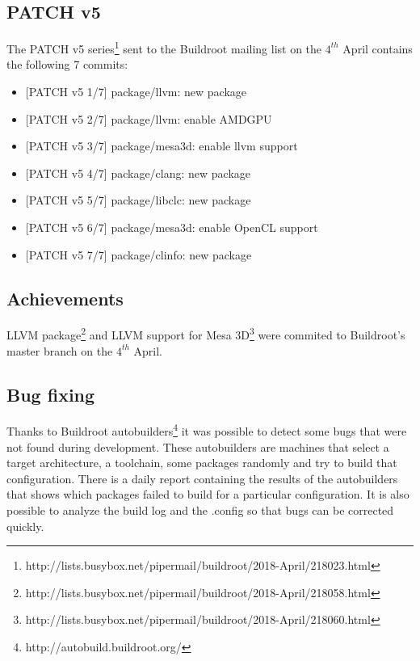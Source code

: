 \documentclass[12pt,a4paper,oneside]{article}
\begin{document}
\subsection*{PATCH v5}
The PATCH v5 series\footnote{http://lists.busybox.net/pipermail/buildroot/2018-April/218023.html}
sent to the Buildroot mailing list on the $4^{th}$ April contains the  following
7 commits:
\begin{itemize}
  \item {[PATCH v5 1/7]} package/llvm: new package
  \item {[PATCH v5 2/7]} package/llvm: enable AMDGPU
  \item {[PATCH v5 3/7]} package/mesa3d: enable llvm support
  \item {[PATCH v5 4/7]} package/clang: new package
  \item {[PATCH v5 5/7]} package/libclc: new package
  \item {[PATCH v5 6/7]} package/mesa3d: enable OpenCL support
  \item {[PATCH v5 7/7]} package/clinfo: new package
\end{itemize}
\newpage
\subsection*{Achievements}
LLVM package\footnote{http://lists.busybox.net/pipermail/buildroot/2018-April/218058.html}
and LLVM support for Mesa 3D\footnote{http://lists.busybox.net/pipermail/buildroot/2018-April/218060.html}
were commited to Buildroot's master branch on the $4^{th}$ April.
\subsection*{Bug fixing}
Thanks to Buildroot autobuilders\footnote{http://autobuild.buildroot.org/} it was
possible to detect some bugs that were not found during development. These
autobuilders are machines that select a target architecture, a toolchain, some
packages randomly and try to build that configuration. There is a daily report
containing the results of the autobuilders that shows which packages failed to
build for a particular configuration. It is also possible to analyze the build
log and the .config so that bugs can be corrected quickly.
\end{document}
